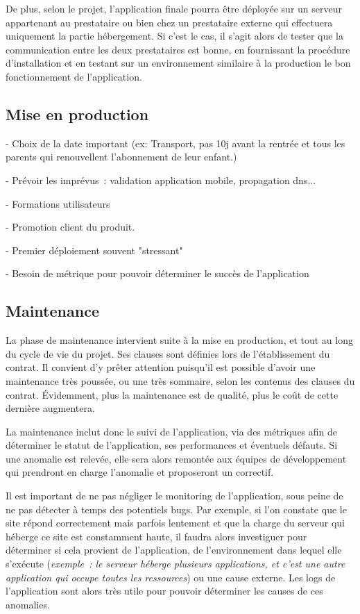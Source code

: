 De plus, selon le projet, l'application finale pourra être déployée sur un serveur appartenant au prestataire ou bien chez un prestataire externe qui effectuera uniquement la partie hébergement. Si c'est le cas, il s'agit alors de tester que la communication entre les deux prestataires est bonne, en fournissant la procédure d'installation et en testant sur un environnement similaire à la production le bon fonctionnement de l'application.

\subsection{Mise en production}

- Choix de la date important (ex: Transport, pas 10j avant la rentrée et tous les parents qui renouvellent l'abonnement de leur enfant.)

- Prévoir les imprévus : validation application mobile, propagation dns...

- Formations utilisateurs

- Promotion client du produit.

- Premier déploiement souvent "stressant"

- Besoin de métrique pour pouvoir déterminer le succès de l'application


\subsection{Maintenance}

La phase de maintenance intervient suite à la mise en production, et tout au long du cycle de vie du projet. Ses clauses sont définies lors de l'établissement du contrat. Il convient d'y prêter attention puisqu'il est possible d'avoir une maintenance très poussée, ou une très sommaire, selon les contenus des clauses du contrat. Évidemment, plus la maintenance est de qualité, plus le coût de cette dernière augmentera.

La maintenance inclut donc le suivi de l'application, via des métriques afin de déterminer le statut de l'application, ses performances et éventuels défauts. Si une anomalie est relevée, elle sera alors remontée aux équipes de développement qui prendront en charge l'anomalie et proposeront un correctif.

Il est important de ne pas négliger le monitoring de l'application, sous peine de ne pas détecter à temps des potentiels bugs. Par exemple, si l'on constate que le site répond correctement mais parfois lentement et que la charge du serveur qui héberge ce site est constamment haute, il faudra alors investiguer pour déterminer si cela provient de l'application, de l'environnement dans lequel elle s'exécute (\emph{exemple : le serveur héberge plusieurs applications, et c'est une autre application qui occupe toutes les ressources}) ou une cause externe. Les logs de l'application sont alors très utile pour pouvoir déterminer les causes de ces anomalies.

